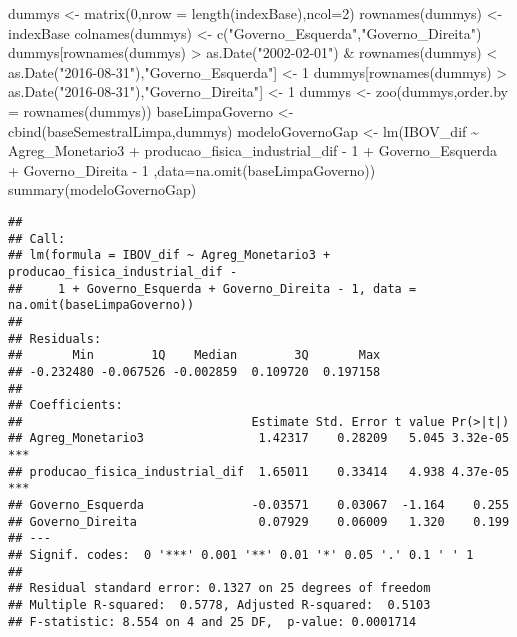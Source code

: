 \documentclass[
]{article}
\newenvironment{Shaded}{\begin{snugshade}}{\end{snugshade}}
\newcommand{\AttributeTok}[1]{\textcolor[rgb]{0.77,0.63,0.00}{#1}}
\newcommand{\DecValTok}[1]{\textcolor[rgb]{0.00,0.00,0.81}{#1}}
\newcommand{\FunctionTok}[1]{\textcolor[rgb]{0.00,0.00,0.00}{#1}}
\newcommand{\NormalTok}[1]{#1}
\newcommand{\OtherTok}[1]{\textcolor[rgb]{0.56,0.35,0.01}{#1}}
\newcommand{\SpecialCharTok}[1]{\textcolor[rgb]{0.00,0.00,0.00}{#1}}
\newcommand{\StringTok}[1]{\textcolor[rgb]{0.31,0.60,0.02}{#1}}
\begin{document}
\begin{Shaded}
\begin{Highlighting}[]
\NormalTok{dummys }\OtherTok{\textless{}{-}} \FunctionTok{matrix}\NormalTok{(}\DecValTok{0}\NormalTok{,}\AttributeTok{nrow =} \FunctionTok{length}\NormalTok{(indexBase),}\AttributeTok{ncol=}\DecValTok{2}\NormalTok{)}
\FunctionTok{rownames}\NormalTok{(dummys) }\OtherTok{\textless{}{-}}\NormalTok{ indexBase}
\FunctionTok{colnames}\NormalTok{(dummys) }\OtherTok{\textless{}{-}} \FunctionTok{c}\NormalTok{(}\StringTok{"Governo\_Esquerda"}\NormalTok{,}\StringTok{"Governo\_Direita"}\NormalTok{)}
\NormalTok{dummys[}\FunctionTok{rownames}\NormalTok{(dummys) }\SpecialCharTok{\textgreater{}} \FunctionTok{as.Date}\NormalTok{(}\StringTok{"2002{-}02{-}01"}\NormalTok{) }\SpecialCharTok{\&} \FunctionTok{rownames}\NormalTok{(dummys) }\SpecialCharTok{\textless{}} \FunctionTok{as.Date}\NormalTok{(}\StringTok{"2016{-}08{-}31"}\NormalTok{),}\StringTok{"Governo\_Esquerda"}\NormalTok{] }\OtherTok{\textless{}{-}} \DecValTok{1}
\NormalTok{dummys[}\FunctionTok{rownames}\NormalTok{(dummys) }\SpecialCharTok{\textgreater{}} \FunctionTok{as.Date}\NormalTok{(}\StringTok{"2016{-}08{-}31"}\NormalTok{),}\StringTok{"Governo\_Direita"}\NormalTok{] }\OtherTok{\textless{}{-}} \DecValTok{1}
\NormalTok{dummys }\OtherTok{\textless{}{-}} \FunctionTok{zoo}\NormalTok{(dummys,}\AttributeTok{order.by =} \FunctionTok{rownames}\NormalTok{(dummys))}
\NormalTok{baseLimpaGoverno }\OtherTok{\textless{}{-}} \FunctionTok{cbind}\NormalTok{(baseSemestralLimpa,dummys)}
\NormalTok{modeloGovernoGap }\OtherTok{\textless{}{-}} \FunctionTok{lm}\NormalTok{(IBOV\_dif }\SpecialCharTok{\textasciitilde{}}\NormalTok{ Agreg\_Monetario3 }\SpecialCharTok{+}\NormalTok{ producao\_fisica\_industrial\_dif  }\SpecialCharTok{{-}} \DecValTok{1} \SpecialCharTok{+}\NormalTok{ Governo\_Esquerda }\SpecialCharTok{+}\NormalTok{ Governo\_Direita }\SpecialCharTok{{-}} \DecValTok{1}
\NormalTok{  ,}\AttributeTok{data=}\FunctionTok{na.omit}\NormalTok{(baseLimpaGoverno))}
\FunctionTok{summary}\NormalTok{(modeloGovernoGap)}
\end{Highlighting}
\end{Shaded}

\begin{verbatim}
## 
## Call:
## lm(formula = IBOV_dif ~ Agreg_Monetario3 + producao_fisica_industrial_dif - 
##     1 + Governo_Esquerda + Governo_Direita - 1, data = na.omit(baseLimpaGoverno))
## 
## Residuals:
##       Min        1Q    Median        3Q       Max 
## -0.232480 -0.067526 -0.002859  0.109720  0.197158 
## 
## Coefficients:
##                                Estimate Std. Error t value Pr(>|t|)    
## Agreg_Monetario3                1.42317    0.28209   5.045 3.32e-05 ***
## producao_fisica_industrial_dif  1.65011    0.33414   4.938 4.37e-05 ***
## Governo_Esquerda               -0.03571    0.03067  -1.164    0.255    
## Governo_Direita                 0.07929    0.06009   1.320    0.199    
## ---
## Signif. codes:  0 '***' 0.001 '**' 0.01 '*' 0.05 '.' 0.1 ' ' 1
## 
## Residual standard error: 0.1327 on 25 degrees of freedom
## Multiple R-squared:  0.5778, Adjusted R-squared:  0.5103 
## F-statistic: 8.554 on 4 and 25 DF,  p-value: 0.0001714
\end{verbatim}
\end{document}
